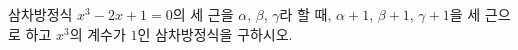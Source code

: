 삼차방정식 $x^3-2x+1=0$의 세 근을 $\alpha$, $\beta$, $\gamma$라 할 때, $\alpha+1$, $\beta+1$, $\gamma+1$을 세 근으로 하고 $x^3$의 계수가 $1$인 삼차방정식을 구하시오.
